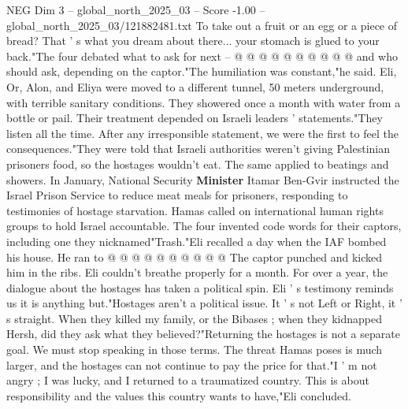 \begin{textsample}{NEG Dim 3 – global\_north\_2025\_03 – Score -1.00 – global\_north\_2025\_03/121882481.txt}
To take out a fruit or an egg or a piece of bread?
That ' s what you dream about there... your stomach is glued to your back."The four debated what to ask for next -- @ @ @ @ @ @ @ @ @ @ and who should ask, depending on the captor."The humiliation was constant,"he said.
Eli, Or, Alon, and Eliya were moved to a different tunnel, 50 meters underground, with terrible sanitary conditions.
They showered once a month with water from a bottle or pail.
Their treatment depended on Israeli leaders ' statements."They listen all the time.
After any irresponsible statement, we were the first to feel the consequences."They were told that Israeli authorities weren't giving Palestinian prisoners food, so the hostages wouldn't eat.
The same applied to beatings and showers.
In January, National Security \textbf{Minister} Itamar Ben-Gvir instructed the Israel Prison Service to reduce meat meals for prisoners, responding to testimonies of hostage starvation.
Hamas called on international human rights groups to hold Israel accountable.
The four invented code words for their captors, including one they nicknamed"Trash."Eli recalled a day when the IAF bombed his house.
He ran to @ @ @ @ @ @ @ @ @ @ The captor punched and kicked him in the ribs.
Eli couldn't breathe properly for a month.
For over a year, the dialogue about the hostages has taken a political spin.
Eli ' s testimony reminds us it is anything but."Hostages aren't a political issue.
It ' s not Left or Right, it ' s straight.
When they killed my family, or the Bibases ; when they kidnapped Hersh, did they ask what they believed?"Returning the hostages is not a separate goal.
We must stop speaking in those terms.
The threat Hamas poses is much larger, and the hostages can not continue to pay the price for that."I ' m not angry ; I was lucky, and I returned to a traumatized country.
This is about responsibility and the values this country wants to have,"Eli concluded.

\end{textsample}
